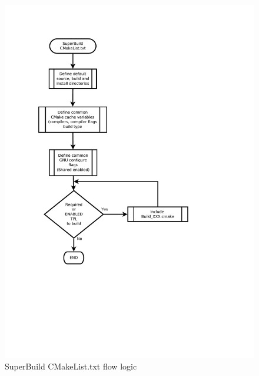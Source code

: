 \documentclass[12pt]{article}
\begin{document}
\begin{figure}
\begin{center}
\includegraphics[width=1.0\textwidth]{figures/SuperBuildCMakeList.pdf}
\end{center}
\caption{SuperBuild CMakeList.txt flow logic}
\end{figure}
\end{document}
